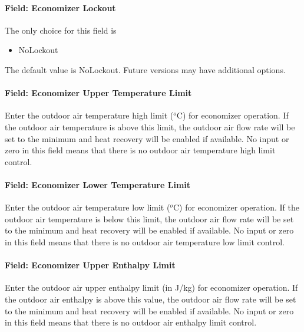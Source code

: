 \paragraph{Field: Economizer Lockout}\label{field-economizer-lockout-3}

The only choice for this field is

\begin{itemize}
\tightlist
\item
  NoLockout
\end{itemize}

The default value is NoLockout. Future versions may have additional options.

\paragraph{Field: Economizer Upper Temperature Limit}\label{field-economizer-upper-temperature-limit-1}

Enter the outdoor air temperature high limit (\(^{o}\)C) for economizer operation. If the outdoor air temperature is above this limit, the outdoor air flow rate will be set to the minimum and heat recovery will be enabled if available. No input or zero in this field means that there is no outdoor air temperature high limit control.

\paragraph{Field: Economizer Lower Temperature Limit}\label{field-economizer-lower-temperature-limit-1}

Enter the outdoor air temperature low limit (\(^{o}\)C) for economizer operation. If the outdoor air temperature is below this limit, the outdoor air flow rate will be set to the minimum and heat recovery will be enabled if available. No input or zero in this field means that there is no outdoor air temperature low limit control.

\paragraph{Field: Economizer Upper Enthalpy Limit}\label{field-economizer-upper-enthalpy-limit-1}

Enter the outdoor air upper enthalpy limit (in J/kg) for economizer operation. If the outdoor air enthalpy is above this value, the outdoor air flow rate will be set to the minimum and heat recovery will be enabled if available. No input or zero in this field means that there is no outdoor air enthalpy limit control.

